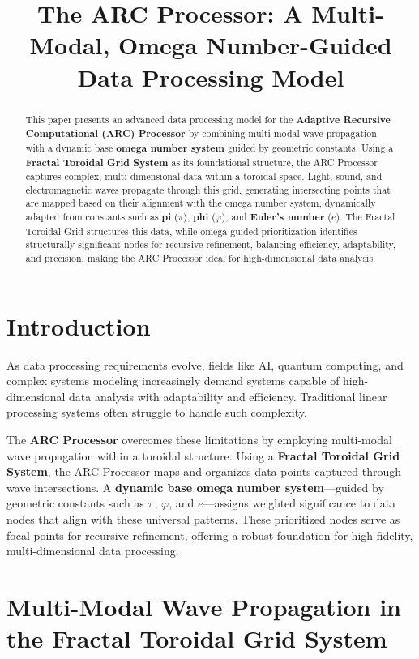 \documentclass{article}
\title{The ARC Processor: A Multi-Modal, Omega Number-Guided Data Processing Model}
\author{}
\date{}
\begin{document}
\maketitle

\begin{abstract}
This paper presents an advanced data processing model for the \textbf{Adaptive Recursive Computational (ARC) Processor} by combining multi-modal wave propagation with a dynamic base \textbf{omega number system} guided by geometric constants. Using a \textbf{Fractal Toroidal Grid System} as its foundational structure, the ARC Processor captures complex, multi-dimensional data within a toroidal space. Light, sound, and electromagnetic waves propagate through this grid, generating intersecting points that are mapped based on their alignment with the omega number system, dynamically adapted from constants such as \textbf{pi} ($\pi$), \textbf{phi} ($\varphi$), and \textbf{Euler’s number} ($e$). The Fractal Toroidal Grid structures this data, while omega-guided prioritization identifies structurally significant nodes for recursive refinement, balancing efficiency, adaptability, and precision, making the ARC Processor ideal for high-dimensional data analysis.
\end{abstract}

\section{Introduction}

As data processing requirements evolve, fields like AI, quantum computing, and complex systems modeling increasingly demand systems capable of high-dimensional data analysis with adaptability and efficiency. Traditional linear processing systems often struggle to handle such complexity.

The \textbf{ARC Processor} overcomes these limitations by employing multi-modal wave propagation within a toroidal structure. Using a \textbf{Fractal Toroidal Grid System}, the ARC Processor maps and organizes data points captured through wave intersections. A \textbf{dynamic base omega number system}—guided by geometric constants such as $\pi$, $\varphi$, and $e$—assigns weighted significance to data nodes that align with these universal patterns. These prioritized nodes serve as focal points for recursive refinement, offering a robust foundation for high-fidelity, multi-dimensional data processing.

\section{Multi-Modal Wave Propagation in the Fractal Toroidal Grid System}
\end{document}
